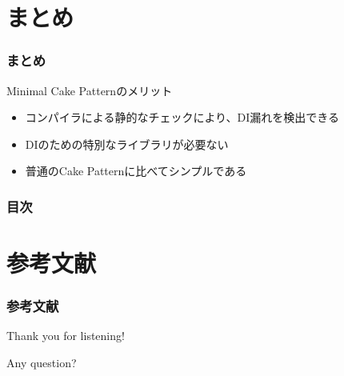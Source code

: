 \section{まとめ}

\begin{frame}
  \frametitle{まとめ}
  
  \begin{block}{Minimal Cake Patternのメリット}
    \begin{itemize}
      \item<2-> コンパイラによる静的なチェックにより、DI漏れを検出できる
      \item<3-> DIのための特別なライブラリが必要ない
      \item<4-> 普通のCake Patternに比べてシンプルである
    \end{itemize}
  \end{block}
\end{frame}

\begin{frame}
  \frametitle{目次}

  \tableofcontents
\end{frame}

\section*{参考文献}

\begin{frame}
  \frametitle{参考文献}

  
  \nocite{*}
  
\end{frame}

\begin{frame}
  \begin{center}
    {\Huge Thank you for listening!}

    \quad \quad

    {\Huge Any question?}
  \end{center}
\end{frame}


